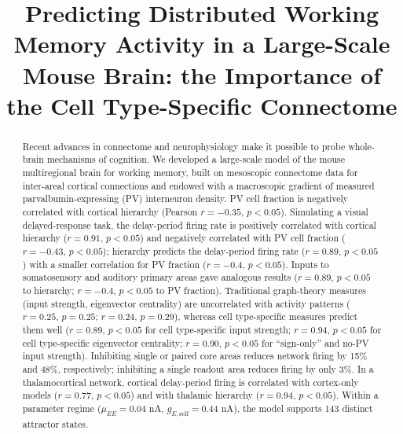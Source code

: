 \documentclass[11pt]{article}
\title{Predicting Distributed Working Memory Activity in a Large-Scale Mouse Brain: the Importance of the Cell Type-Specific Connectome}
\author{}
\date{}
\begin{document}
\maketitle

\begin{abstract}
Recent advances in connectome and neurophysiology make it possible to probe whole-brain mechanisms of cognition. We developed a large-scale model of the mouse multiregional brain for working memory, built on mesoscopic connectome data for inter-areal cortical connections and endowed with a macroscopic gradient of measured parvalbumin-expressing (PV) interneuron density. PV cell fraction is negatively correlated with cortical hierarchy (Pearson $r = -0.35$, $p < 0.05$). Simulating a visual delayed-response task, the delay-period firing rate is positively correlated with cortical hierarchy ($r = 0.91$, $p < 0.05$) and negatively correlated with PV cell fraction ($r = -0.43$, $p < 0.05$); hierarchy predicts the delay-period firing rate ($r = 0.89$, $p < 0.05$) with a smaller correlation for PV fraction ($r = -0.4$, $p < 0.05$). Inputs to somatosensory and auditory primary areas gave analogous results ($r = 0.89$, $p < 0.05$ to hierarchy; $r = -0.4$, $p < 0.05$ to PV fraction). Traditional graph-theory measures (input strength, eigenvector centrality) are uncorrelated with activity patterns ($r = 0.25$, $p = 0.25$; $r = 0.24$, $p = 0.29$), whereas cell type-specific measures predict them well ($r = 0.89$, $p < 0.05$ for cell type-specific input strength; $r = 0.94$, $p < 0.05$ for cell type-specific eigenvector centrality; $r = 0.90$, $p < 0.05$ for ``sign-only'' and no-PV input strength). Inhibiting single or paired core areas reduces network firing by 15\% and 48\%, respectively; inhibiting a single readout area reduces firing by only 3\%. In a thalamocortical network, cortical delay-period firing is correlated with cortex-only models ($r = 0.77$, $p < 0.05$) and with thalamic hierarchy ($r = 0.94$, $p < 0.05$). Within a parameter regime ($\mu_{EE} = 0.04$ nA, $g_{E,\mathrm{self}} = 0.44$ nA), the model supports 143 distinct attractor states.
\end{abstract}
\end{document}
